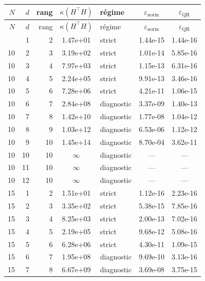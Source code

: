 \begin{longtable}{r r r S[table-format=1.2e-2] l S[table-format=1.2e-2] S[table-format=1.2e-2]}
\toprule
{\(N\)} & {\(d\)} & {rang} & {\(\kappa(H^{\top}H)\)} & {r\'egime} & {\(\varepsilon_{\mathrm{norm}}\)} & {\(\varepsilon_{\mathrm{QR}}\)} \\
\midrule
\endfirsthead
\toprule
{\(N\)} & {\(d\)} & {rang} & {\(\kappa(H^{\top}H)\)} & {r\'egime} & {\(\varepsilon_{\mathrm{norm}}\)} & {\(\varepsilon_{\mathrm{QR}}\)} \\
\midrule
\endhead
\bottomrule
{} & 1 & 2 & 1.47e+01 & strict & 1.44e-15 & 1.44e-16 \\
10 & 2 & 3 & 3.19e+02 & strict & 1.01e-14 & 5.85e-16 \\
10 & 3 & 4 & 7.97e+03 & strict & 1.15e-13 & 6.31e-16 \\
10 & 4 & 5 & 2.24e+05 & strict & 9.91e-13 & 3.46e-16 \\
10 & 5 & 6 & 7.28e+06 & strict & 4.21e-11 & 1.06e-15 \\
10 & 6 & 7 & 2.84e+08 & diagnostic & 3.37e-09 & 1.40e-13 \\
10 & 7 & 8 & 1.42e+10 & diagnostic & 1.77e-08 & 1.04e-12 \\
10 & 8 & 9 & 1.03e+12 & diagnostic & 6.53e-06 & 1.12e-12 \\
10 & 9 & 10 & 1.45e+14 & diagnostic & 8.70e-04 & 3.62e-11 \\
10 & 10 & 10 & {\(\infty\)} & diagnostic & {---} & {---} \\
10 & 11 & 10 & {\(\infty\)} & diagnostic & {---} & {---} \\
10 & 12 & 10 & {\(\infty\)} & diagnostic & {---} & {---} \\
15 & 1 & 2 & 1.51e+01 & strict & 1.12e-16 & 2.23e-16 \\
15 & 2 & 3 & 3.35e+02 & strict & 5.38e-15 & 7.85e-16 \\
15 & 3 & 4 & 8.25e+03 & strict & 2.00e-13 & 7.02e-16 \\
15 & 4 & 5 & 2.19e+05 & strict & 9.68e-12 & 5.08e-16 \\
15 & 5 & 6 & 6.28e+06 & strict & 4.30e-11 & 1.09e-15 \\
15 & 6 & 7 & 1.95e+08 & diagnostic & 9.69e-10 & 3.13e-16 \\
15 & 7 & 8 & 6.67e+09 & diagnostic & 3.69e-08 & 3.75e-15 \\

\end{longtable}
